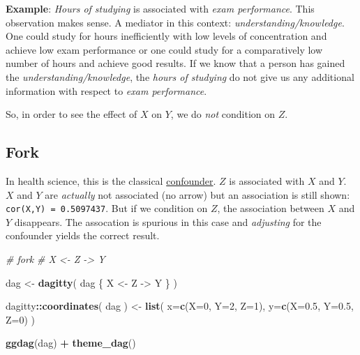 \documentclass[
]{book}
\newenvironment{Shaded}{\begin{snugshade}}{\end{snugshade}}
\newcommand{\AttributeTok}[1]{\textcolor[rgb]{0.13,0.29,0.53}{#1}}
\newcommand{\CommentTok}[1]{\textcolor[rgb]{0.56,0.35,0.01}{\textit{#1}}}
\newcommand{\DecValTok}[1]{\textcolor[rgb]{0.00,0.00,0.81}{#1}}
\newcommand{\FloatTok}[1]{\textcolor[rgb]{0.00,0.00,0.81}{#1}}
\newcommand{\FunctionTok}[1]{\textcolor[rgb]{0.13,0.29,0.53}{\textbf{#1}}}
\newcommand{\NormalTok}[1]{#1}
\newcommand{\OtherTok}[1]{\textcolor[rgb]{0.56,0.35,0.01}{#1}}
\newcommand{\SpecialCharTok}[1]{\textcolor[rgb]{0.81,0.36,0.00}{\textbf{#1}}}
\newcommand{\StringTok}[1]{\textcolor[rgb]{0.31,0.60,0.02}{#1}}
\begin{document}
\textbf{Example}: \emph{Hours of studying} is associated with \emph{exam performance}.
This observation makes sense. A mediator in this context: \emph{understanding/knowledge}.
One could study for hours inefficiently with low levels of concentration
and achieve low exam performance or one could study for a comparatively
low number of hours and achieve good results. If we know that a person has gained the
\emph{understanding/knowledge}, the \emph{hours of studying} do not give us any additional
information with respect to \emph{exam performance}.

So, in order to see the effect of \(X\) on \(Y\), we do \emph{not} condition on \(Z\).

\subsection{Fork}\label{fork}

In health science, this is the classical \href{https://en.wikipedia.org/wiki/Confounding}{confounder}.
\(Z\) is associated with \(X\) and \(Y\). \(X\) and \(Y\) are \emph{actually} not associated (no arrow) but an association is
still shown: \texttt{cor(X,Y)\ =\ 0.5097437}.
But if we condition on \(Z\), the association between \(X\) and \(Y\) disappears. The assocation is
spurious in this case and \emph{adjusting} for the confounder yields the correct result.

\begin{Shaded}
\begin{Highlighting}[]
\CommentTok{\# fork}
\CommentTok{\# X \textless{}{-} Z {-}\textgreater{} Y}

\NormalTok{dag }\OtherTok{\textless{}{-}} \FunctionTok{dagitty}\NormalTok{( }\StringTok{\textquotesingle{}dag \{}
\StringTok{  X \textless{}{-} Z {-}\textgreater{} Y}
\StringTok{\}\textquotesingle{}}\NormalTok{ )}

\NormalTok{dagitty}\SpecialCharTok{::}\FunctionTok{coordinates}\NormalTok{( dag ) }\OtherTok{\textless{}{-}}
  \FunctionTok{list}\NormalTok{( }\AttributeTok{x=}\FunctionTok{c}\NormalTok{(}\AttributeTok{X=}\DecValTok{0}\NormalTok{, }\AttributeTok{Y=}\DecValTok{2}\NormalTok{, }\AttributeTok{Z=}\DecValTok{1}\NormalTok{),}
        \AttributeTok{y=}\FunctionTok{c}\NormalTok{(}\AttributeTok{X=}\FloatTok{0.5}\NormalTok{, }\AttributeTok{Y=}\FloatTok{0.5}\NormalTok{, }\AttributeTok{Z=}\DecValTok{0}\NormalTok{) )}

\FunctionTok{ggdag}\NormalTok{(dag) }\SpecialCharTok{+} \FunctionTok{theme\_dag}\NormalTok{()}
\end{Highlighting}
\end{Shaded}
\end{document}
